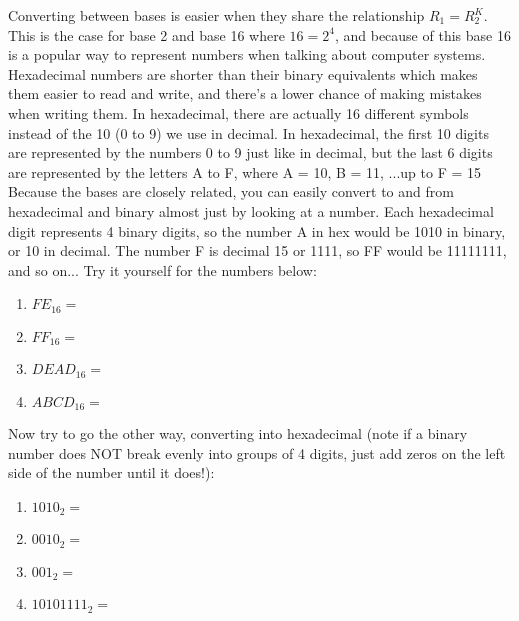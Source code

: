 \documentclass[a4paper,12pt]{article} %
\begin{document}
Converting between bases is easier when they share the relationship $R_{1} = R_{2}^K$. This is the case for base 2 and base 16 where $16 = 2^4$, and because of this base 16 is a popular way to represent numbers when talking about computer systems. Hexadecimal numbers are shorter than their binary equivalents which makes them easier to read and write, and there's a lower chance of making mistakes when writing them. In hexadecimal, there are actually 16 different symbols instead of the 10 (0 to 9) we use in decimal. In hexadecimal, the first 10 digits are represented by the numbers 0 to 9 just like in decimal, but the last 6 digits are represented by the letters A to F, where A = 10, B = 11, ...up to F = 15\\

\noindent
Because the bases are closely related, you can easily convert to and from hexadecimal and binary almost just by looking at a number. Each hexadecimal digit represents 4 binary digits, so the number A in hex would be 1010 in binary, or 10 in decimal. The number F is decimal 15 or 1111, so FF would be 11111111, and so on... Try it yourself for the numbers below:

\begin{enumerate}[resume]
\item $FE_{16} = $
\item $FF_{16} = $
\item $DEAD_{16} = $
\item $ABCD_{16} = $
\end{enumerate}

\noindent
Now try to go the other way, converting into hexadecimal (note if a binary number does NOT break evenly into groups of 4 digits, just add zeros on the left side of the number until it does!):

\begin{enumerate}[resume]
\item $1010_{2} = $
\item $0010_{2} = $
\item $001_{2} = $
\item $10101111_{2} = $
\end{enumerate}
\end{document}
